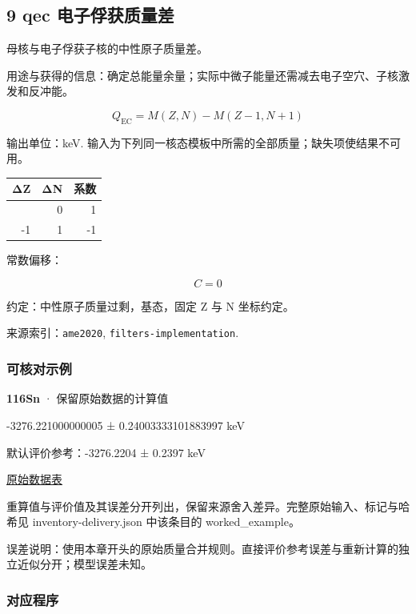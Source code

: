 \documentclass[
  11pt,
  letterpaper,
]{article}
\begin{document}
\subsection{9 qec
电子俘获质量差}\label{qec-ux7535ux5b50ux4fd8ux83b7ux8d28ux91cfux5dee}

母核与电子俘获子核的中性原子质量差。

用途与获得的信息：确定总能量余量；实际中微子能量还需减去电子空穴、子核激发和反冲能。

\[
Q_{\mathrm{EC}}=M(Z,N)-M(Z-1,N+1)
\]

输出单位：keV.
输入为下列同一核态模板中所需的全部质量；缺失项使结果不可用。

\begin{longtable}[]{@{}rrr@{}}
\toprule\noalign{}
ΔZ & ΔN & 系数 \\
\midrule\noalign{}
\endhead
\bottomrule\noalign{}
\endlastfoot
0 & 0 & 1 \\
-1 & 1 & -1 \\
\end{longtable}

常数偏移：

\[
C=0
\]

约定：中性原子质量过剩，基态，固定 Z 与 N 坐标约定。

来源索引：\texttt{ame2020}, \texttt{filters-implementation}.

\subsubsection{可核对示例}\label{ux53efux6838ux5bf9ux793aux4f8b-8}

\textbf{116Sn} · 保留原始数据的计算值

-3276.221000000005 ± 0.24003333101883997 keV

默认评价参考：-3276.2204 ± 0.2397 keV

\href{https://www-nds.iaea.org/amdc/ame2020/mass_1.mas20.txt}{原始数据表}

重算值与评价值及其误差分开列出，保留来源舍入差异。完整原始输入、标记与哈希见
inventory-delivery.json 中该条目的 worked\_example。

误差说明：使用本章开头的原始质量合并规则。直接评价参考误差与重新计算的独立近似分开；模型误差未知。

\subsubsection{对应程序}\label{ux5bf9ux5e94ux7a0bux5e8f-8}
\end{document}
